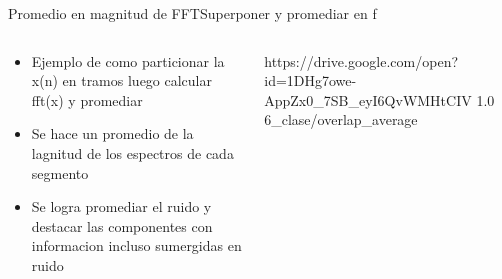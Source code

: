 \begin{frame}[t]{Promedio en magnitud de FFT}{Superponer y promediar en f}
   \begin{columns}[t]
      \footnotesize
      \begin{column}{.4\textwidth}
         \begin{itemize}
            \item{Ejemplo de como particionar la x(n) en tramos luego calcular fft(x) y promediar}
            \item{Se hace un promedio de la lagnitud de los espectros de cada segmento}
            \item{Se logra promediar el ruido y destacar las componentes con informacion incluso sumergidas en ruido}
         \end{itemize}
      \end{column}
      \hspace{2pt}
      \vrule
      \hspace{2pt}
      \begin{column}{.6\textwidth}
         {https://drive.google.com/open?id=1DHg7owe-AppZx0_7SB_eyI6QvWMHtCIV}
         {1.0}
         {6_clase/overlap_average}
      \end{column}
      \hspace{2pt}
   \end{columns}
   \vfill
\end{frame}
